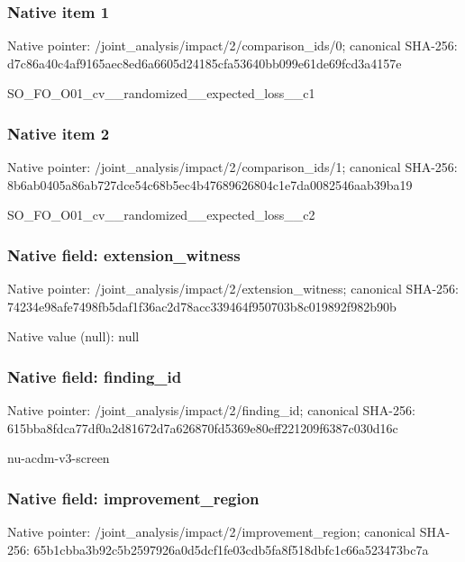 \documentclass[10pt,a4paper]{article}
\begin{document}
\subsubsection{Native item 1}
Native pointer: /joint\_\allowbreak{}analysis/impact/2/comparison\_\allowbreak{}ids/0; canonical SHA-256: d7c86a40c4af9165aec8ed6a6605d24185cfa53640bb099e61de69fcd3a4157e

\begingroup\raggedright\sloppy SO\_\allowbreak{}FO\_\allowbreak{}O01\_\allowbreak{}cv\_\allowbreak{}\_\allowbreak{}randomized\_\allowbreak{}\_\allowbreak{}expected\_\allowbreak{}loss\_\allowbreak{}\_\allowbreak{}c1\par\endgroup

\subsubsection{Native item 2}
Native pointer: /joint\_\allowbreak{}analysis/impact/2/comparison\_\allowbreak{}ids/1; canonical SHA-256: 8b6ab0405a86ab727dce54c68b5ec4b47689626804c1e7da0082546aab39ba19

\begingroup\raggedright\sloppy SO\_\allowbreak{}FO\_\allowbreak{}O01\_\allowbreak{}cv\_\allowbreak{}\_\allowbreak{}randomized\_\allowbreak{}\_\allowbreak{}expected\_\allowbreak{}loss\_\allowbreak{}\_\allowbreak{}c2\par\endgroup

\subsubsection{Native field: extension\_\allowbreak{}witness}
Native pointer: /joint\_\allowbreak{}analysis/impact/2/extension\_\allowbreak{}witness; canonical SHA-256: 74234e98afe7498fb5daf1f36ac2d78acc339464f950703b8c019892f982b90b

Native value (null): null

\subsubsection{Native field: finding\_\allowbreak{}id}
Native pointer: /joint\_\allowbreak{}analysis/impact/2/finding\_\allowbreak{}id; canonical SHA-256: 615bba8fdca77df0a2d81672d7a626870fd5369e80eff221209f6387c030d16c

\begingroup\raggedright\sloppy nu-acdm-v3-screen\par\endgroup

\subsubsection{Native field: improvement\_\allowbreak{}region}
Native pointer: /joint\_\allowbreak{}analysis/impact/2/improvement\_\allowbreak{}region; canonical SHA-256: 65b1cbba3b92c5b2597926a0d5dcf1fe03cdb5fa8f518dbfc1c66a523473bc7a
\end{document}
